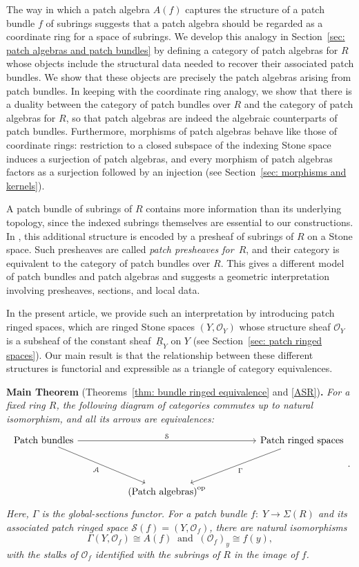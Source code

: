 \documentclass[11pt]{amsart}
\def\O{{\mathcal{O}}}
\begin{document}
The way in which a patch algebra $A(f)$ captures the structure of a patch bundle $f$ of subrings suggests that a patch algebra should be regarded as a coordinate ring for a space of subrings. We develop this analogy in Section~\ref{sec: patch algebras and patch bundles} by defining a category of patch algebras for $R$ whose objects include the structural data needed to recover their associated patch bundles. We show that these objects are precisely the patch algebras arising from patch bundles. In keeping with the coordinate ring analogy, we show that there is a duality between the category of patch bundles over $R$ and the category of patch algebras for $R$, so that patch algebras are indeed the algebraic counterparts of patch bundles. Furthermore, morphisms of patch algebras behave like those of coordinate rings: restriction to a closed subspace of the indexing Stone space induces a surjection of patch algebras, and every morphism of patch algebras factors as a surjection followed by an injection (see Section~\ref{sec: morphisms and kernels}).

 A patch bundle of subrings of $R$ contains more information than its underlying topology, since the indexed subrings themselves are essential to our constructions. In \cite{CosOlb}, this additional structure is encoded by a presheaf of subrings of $R$ on a Stone space. Such presheaves are called {\it patch presheaves for~$R$}, and their category is equivalent to the category of patch bundles over $R$. 
 This gives a different model of patch bundles and patch algebras and suggests a geometric interpretation involving presheaves, sections, and local data.


 In the present article, we provide such an interpretation by introducing patch ringed spaces, which are ringed Stone spaces $(Y,\mathcal O_Y)$ whose structure sheaf $\O_Y$ is a subsheaf of the constant sheaf~$\underline R_Y$ on $Y$ (see Section~\ref{sec: patch ringed spaces}). Our main result is that the relationship between these different structures is functorial and expressible as a triangle of category equivalences.  
 
\medskip

{\noindent}{\bf Main Theorem} (Theorems~\ref{thm: bundle ringed equivalence} and \ref{ASR}){\bf .} \textit{For a fixed ring $R$, the following diagram of categories commutes up to natural isomorphism, and all its arrows are equivalences:}
\[\begin{tikzcd}
	\mbox{Patch bundles} &&&& \mbox{Patch ringed spaces} \\
	\\
	&& {\mbox{(Patch algebras)}^{\rm op}}
	\arrow["{\mathcal S}", from=1-1, to=1-5]
	\arrow["{\mathcal A}"', from=1-1, to=3-3]
	\arrow["\Gamma", from=1-5, to=3-3]
\end{tikzcd}.\]
\textit{Here, $\Gamma$ is the global-sections functor. For a patch bundle $f\colon\; Y\to \Sigma(R)$ and its associated patch ringed space $\mathcal S(f)=(Y,\mathcal O_f)$, there are natural isomorphisms  
\[\Gamma(Y,\mathcal O_f)\cong A(f)
 \: {\mbox{ and }} \: 
(\mathcal O_f)_y\cong f(y),\]
 with the stalks of $\O_f$ identified with the subrings of $R$ in the image of $f$.}
\end{document}
